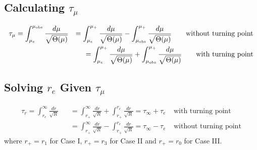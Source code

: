 \documentclass[12pt]{book}
\begin{document}
\subsection{Calculating $\tau_\mu$}
\begin{eqnarray}
 \tau_\mu=\int_{\mu_e}^{\mu_{\rm obs}}\frac{d\mu}{\sqrt{\Theta(\mu)}}
&&=\int_{\mu_e}^{\mu_{+}}\frac{d\mu}{\sqrt{\Theta(\mu)}}-
\int_{\mu_{\rm obs}}^{\mu_{+}}\frac{d\mu}{\sqrt{\Theta(\mu)}}~~~~~~\text{without turning point}\\
&&=\int_{\mu_e}^{\mu_{+}}\frac{d\mu}{\sqrt{\Theta(\mu)}}+
\int_{\mu_{\rm obs}}^{\mu_{+}}\frac{d\mu}{\sqrt{\Theta(\mu)}}~~~~~~\text{with turning point}
\end{eqnarray}

\subsection{Solving $r_{e}$ Given $\tau_\mu$}
\begin{eqnarray}
 \tau_r=\int_{r_e}^{\infty}\frac{dr}{\sqrt{R}}&&=\int_{r_+}^{\infty}\frac{dr}{\sqrt{R}}+
\int_{r_+}^{r_e}\frac{dr}{\sqrt{R}}=\tau_{\infty}+\tau_{e}~~~~~\text{with turning point}\\
&&=\int_{r_+}^{\infty}\frac{dr}{\sqrt{R}}-\int_{r_+}^{r_e}\frac{dr}{\sqrt{R}}=\tau_{\infty}-\tau_{e}~~~~~\text{without turning point}
\end{eqnarray}
where $r_+=r_1$ for Case I, $r_+=r_3$ for Case II and $r_+=r_0$ for Case III.
\end{document}
